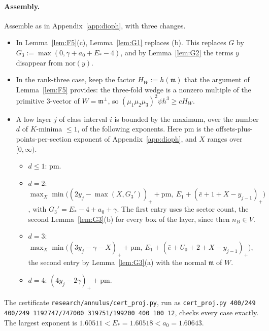 \paragraph{Assembly.} Assemble as in Appendix~\ref{app:dioph}, with three changes.
\begin{itemize}\setlength\itemsep{0pt}
\item In Lemma~\ref{lem:F5}(c), Lemma~\ref{lem:G1} replaces (b). This replaces $G$ by
$G_3:=\max(0,\gamma+a_0+E_*-4)$, and by Lemma~\ref{lem:G2} the terms $y$ disappear from $\mathrm{nor}(y)$.
\item In the rank-three case, keep the factor $H_W:=h(\mathfrak m)$ that the argument of
Lemma~\ref{lem:F5} provides: the three-fold wedge is a nonzero multiple of the primitive $3$-vector of
$W=\mathfrak m^\perp$, so $(\mu_1\mu_2\mu_3)^2\psi h^3\ge cH_W$.
\item A low layer $j$ of class interval $i$ is bounded by the maximum, over the number $d$ of $K$-minima
$\le1$, of the following exponents. Here $\mathrm{pm}$ is the offsets-plus-points-per-section exponent of
Appendix~\ref{app:dioph}, and $X$ ranges over $[0,\infty)$.
\begin{itemize}\setlength\itemsep{0pt}
\item $d\le1$: $\mathrm{pm}$.
\item $d=2$: $\max_X\min\big((2y_j-\max(X,G_3'))_++\mathrm{pm},\ E_1+(\bar e+1+X-y_{j-1})_+\big)$, with
$G_3'=E_*-4+a_0+\gamma$. The first entry uses the sector count, the second Lemma~\ref{lem:G3}(b) for every
box of the layer, since then $n_B\in V$.
\item $d=3$: $\max_X\min\big((3y_j-\gamma-X)_++\mathrm{pm},\ E_1+(\bar e+U_0+2+X-y_{j-1})_+\big)$, the
second entry by Lemma~\ref{lem:G3}(a) with the normal $\mathfrak m$ of $W$.
\item $d=4$: $(4y_j-2\gamma)_++\mathrm{pm}$.
\end{itemize}
\end{itemize}
The certificate \texttt{research/annulus/cert\_proj.py}, run as
\texttt{cert\_proj.py 400/249 400/249 1192747/747000 319751/199200 400 100 12}, checks every case exactly.
The largest exponent is $1.60511<E_*=1.60518<a_0=1.60643$.
